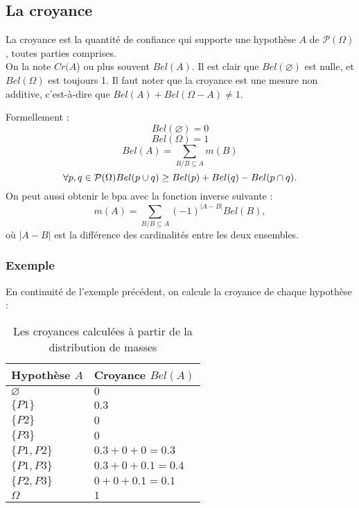 \subsection{La croyance}

La croyance est la quantité de confiance qui supporte une hypothèse $A$ de
$\mathcal{P}(\Omega)$, toutes parties comprises.\\
On la note $Cr(A$) ou plus souvent $Bel(A)$. Il est clair que $Bel(\varnothing)$
est nulle, et $Bel(\Omega)$ est toujours 1. Il faut noter que la croyance est une
mesure non additive, c’est-à-dire que $Bel(A) + Bel(\Omega - A) \neq 1$.

Formellement :
\begin{equation}
Bel(\varnothing)=0
\end{equation}
\begin{equation}
Bel(\Omega)=1
\end{equation}
\begin{equation}
Bel(A) = \sum_{B \slash B \subseteq A} m(B)
\end{equation}
\begin{equation}
\forall p,q \in \mathcal{P}(\Omega) \medskip Bel(p \cup q) \geq Bel(p) + Bel(q) - Bel(p \cap q).
\end{equation}
On peut aussi obtenir le bpa avec la fonction inverse suivante :
\begin{equation}
m(A) = \sum_{B \slash B \subseteq A} (-1)^{|A-B|} Bel(B),
\end{equation}
où $|A-B|$ est la différence des cardinalités entre les deux ensembles.

\subsubsection{Exemple}
En continuité de l'exemple précédent, on calcule la croyance de chaque hypothèse :

\begin{table}[h!]
\centering
\begin{tabular}{|l|l|}
\hline
Hypothèse $A$ & Croyance $Bel(A)$\\
\hline
$\varnothing$ & $0$ \\
\hline
$\{P1\}$ & $0.3$ \\
\hline
$\{P2\}$ & $0$ \\
\hline
$\{P3\}$ & $0$ \\
\hline
$\{P1, P2\}$ & $0.3 + 0 + 0 = 0.3$ \\
\hline
$\{P1, P3\}$ & $0.3 + 0 + 0.1 = 0.4$ \\
\hline
$\{P2, P3\}$ & $0 + 0 + 0.1 = 0.1$ \\
\hline
$\Omega$ & $1$ \\
\hline
\end{tabular}
\caption{Les croyances calculées à partir de la distribution de masses}
\end{table}

